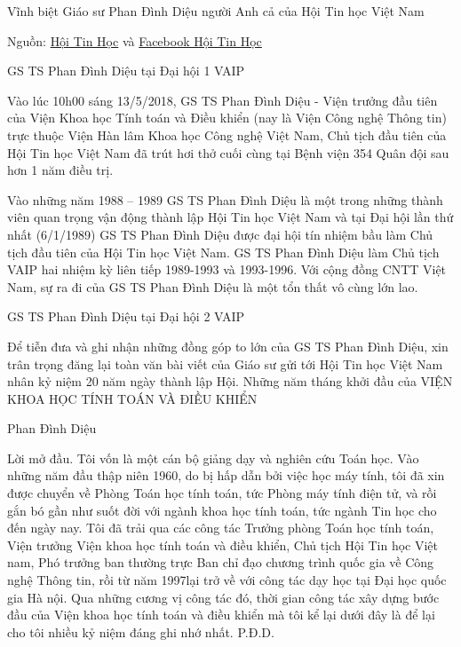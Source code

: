 Vĩnh biệt Giáo sư Phan Đình Diệu người Anh cả của Hội Tin học Việt Nam

Nguồn: \href{http://www.vaip.org.vn/default.asp?page=newsdetail&newsid=13733&fbclid=IwAR0PcSyHbjZmQ6W_EHyCeOJCKn49n_NqSSrDNALrCCCHQM_bB-Mf68HMaX0}{Hội Tin Học} và \href{https://www.facebook.com/HoiTinhocVietnam/posts/1645971555488298}{Facebook Hội Tin Học}

GS TS Phan Đình Diệu tại Đại hội 1 VAIP

Vào lúc 10h00 sáng 13/5/2018, GS TS Phan Đình Diệu - Viện trưởng đầu tiên của Viện Khoa học Tính toán và Điều khiển (nay là Viện Công nghệ Thông tin) trực thuộc Viện Hàn lâm Khoa học Công nghệ Việt Nam, Chủ tịch đầu tiên của Hội Tin học Việt Nam đã trút hơi thở cuối cùng tại Bệnh viện 354 Quân đội sau hơn 1 năm điều trị.

Vào những năm 1988 – 1989 GS TS Phan Đình Diệu là một trong những thành viên quan trọng  vận động thành lập Hội Tin học Việt Nam và tại Đại hội lần thứ nhất (6/1/1989) GS TS Phan Đình Diệu được đại hội tín nhiệm bầu làm Chủ tịch đầu tiên của Hội Tin học Việt Nam. GS TS Phan Đình Diệu làm Chủ tịch VAIP hai nhiệm kỳ liên tiếp 1989-1993 và 1993-1996. Với cộng đồng CNTT Việt Nam, sự ra đi của GS TS Phan Đình Diệu là một tổn thất vô cùng lớn lao.

GS TS Phan Đình Diệu tại Đại hội 2 VAIP

Để tiễn đưa và ghi nhận những đồng góp to lớn của GS TS Phan Đình Diệu, xin trân trọng đăng lại toàn văn bài viết của Giáo sư gửi tới Hội Tin học Việt Nam nhân kỷ niệm 20 năm ngày thành lập Hội.
Những năm tháng khởi đầu của VIỆN KHOA HỌC TÍNH TOÁN VÀ ĐIỀU KHIỂN

Phan Đình Diệu

Lời mở đầu. Tôi vốn là một cán bộ giảng dạy và nghiên cứu Toán học. Vào những năm đầu thập niên 1960, do bị hấp dẫn bởi việc học máy tính, tôi đã xin được chuyển về Phòng Toán học tính toán, tức Phòng máy tính điện tử, và rồi gắn bó gần như suốt đời với ngành khoa học tính toán, tức ngành Tin học cho đến ngày nay. Tôi đã trải qua các công tác Trưởng phòng Toán học tính toán, Viện trưởng Viện khoa học tính toán và điều khiển, Chủ tịch Hội Tin học Việt nam, Phó trưởng ban thường trực Ban chỉ đạo chương trình quốc gia về Công nghệ Thông tin, rồi từ năm 1997lại trở về với công tác dạy học tại Đại học quốc gia Hà nội. Qua những cương vị công tác đó, thời gian công tác xây dựng bước đầu của Viện khoa học tính toán và điều khiển mà tôi kể lại dưới đây là để lại cho tôi nhiều kỷ niệm đáng ghi nhớ nhất. P.Đ.D.

